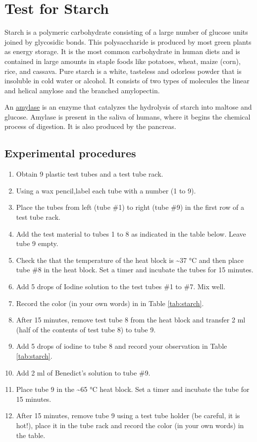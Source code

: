 \section{Test for Starch}\label{test-for-starch}

Starch is a polymeric carbohydrate consisting of a large number of
glucose units joined by glycosidic bonds. This polysaccharide is
produced by most green plants as energy storage. It is the most common
carbohydrate in human diets and is contained in large amounts in staple
foods like potatoes, wheat, maize (corn), rice, and cassava. Pure starch
is a white, tasteless and odorless powder that is insoluble in cold
water or alcohol. It consists of two types of molecules the linear and
helical amylose and the branched amylopectin.

An \href{https://en.wikipedia.org/wiki/Amylase}{amylase} is an enzyme
that catalyzes the hydrolysis of starch into maltose and glucose.
Amylase is present in the saliva of humans, where it begins the chemical
process of digestion. It is also produced by the pancreas.

\subsection{Experimental procedures}\label{experimental-procedures-2}

\begin{enumerate}
\def\labelenumi{\arabic{enumi}.}
\tightlist
\item
  Obtain 9 plastic test tubes and a test tube rack.
\item
  Using a wax pencil,label each tube with a number (1 to 9).
\item
  Place the tubes from left (tube \#1) to right (tube \#9) in the first
  row of a test tube rack.
\item
  Add the test material to tubes 1 to 8 as indicated in the table below.
  Leave tube 9 empty.
\item
  Check the that the temperature of the heat block is
  \textasciitilde{}37 °C and then place tube \#8 in the heat block. Set
  a timer and incubate the tubes for 15 minutes.
\item
  Add 5 drops of Iodine solution to the test tubes \#1 to \#7. Mix well.
\item
  Record the color (in your own words) in in Table \ref{tab:starch}.
\item
  After 15 minutes, remove test tube 8 from the heat block and transfer
  2 ml (half of the contents of test tube 8) to tube 9.
\item
  Add 5 drops of iodine to tube 8 and record your observation in Table
  \ref{tab:starch}.
\item
  Add 2 ml of Benedict's solution to tube \#9.
\item
  Place tube 9 in the \textasciitilde{}65 °C heat block. Set a timer and
  incubate the tube for 15 minutes.
\item
  After 15 minutes, remove tube 9 using a test tube holder (be careful,
  it is hot!), place it in the tube rack and record the color (in your
  own words) in the table.
\end{enumerate}

